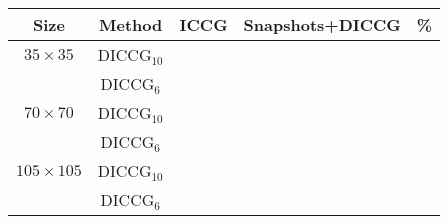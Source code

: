 \documentclass[a4paper,10pt]{article}
\begin{document}
\begin{table}[!h]
\begin{minipage}{1\textwidth}
\vspace{-10pt}
\centering
\begin{tabular}{ |c|c|c|c|c|} 

\hline
Size&Method& ICCG & Snapshots+DICCG &\% \\
\hline
$35\times35$ &DICCG$_{10}$& &  & \\
&DICCG$_6$& &  & \\
\hline
$70\times70$ &DICCG$_{10}$& &  & \\
 &DICCG$_6$& &  & \\
\hline
$105\times105$ &DICCG$_{10}$& &  & \\
 &DICCG$_6$& &  & \\
 \hline
 \end{tabular}
\end{minipage}
\end{table}
\end{document}
